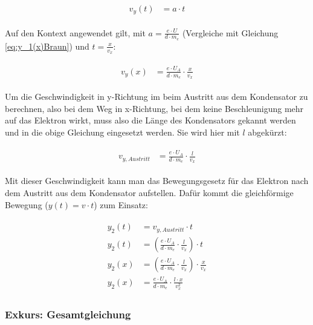 \begin{align} \label{eq:v(t)Allgemein}
\begin{split}
	v_y(t) &= a \cdot t
\end{split}
\end{align}

\noindent Auf den Kontext angewendet gilt, mit $a = \frac{e \cdot U}{d \cdot m_e}$ (Vergleiche mit Gleichung \ref{eq:y_1(x)Braun}) und $t=\frac{x}{v_x}$:

\begin{align} \label{eq:v(x)Kontext}
\begin{split}
	v_y(x) &= \frac{e \cdot U_A}{d \cdot m_e} \cdot \frac{x}{v_x}
\end{split}
\end{align}

\noindent Um die Geschwindigkeit in y-Richtung im beim Austritt aus dem Kondensator zu berechnen, also bei dem Weg in x-Richtung, bei dem keine Beschleunigung mehr auf das Elektron wirkt, muss also die Länge des Kondensators gekannt werden und in die obige Gleichung eingesetzt werden. Sie wird hier mit $l$ abgekürzt:

\begin{align} \label{eq:v(t)Gesamt}
\begin{split}
	v_{y,Austritt} &= \frac{e \cdot U_A}{d \cdot m_e} \cdot \frac{l}{v_x}
\end{split}
\end{align}

\noindent Mit dieser Geschwindigkeit kann man das Bewegungsgesetz für das Elektron nach dem Austritt aus dem Kondensator aufstellen. Dafür kommt die gleichförmige Bewegung ($y(t) = v \cdot t$) zum Einsatz:

\begin{align} \label{eq:y(t)Gesamt}
\begin{split}
	y_2(t) &= v_{y,Austritt} \cdot t \\
	y_2(t) &= (\frac{e \cdot U_A}{d \cdot m_e} \cdot \frac{l}{v_x}) \cdot t \\
	y_2(x) &= (\frac{e \cdot U_A}{d \cdot m_e} \cdot \frac{l}{v_x}) \cdot \frac{x}{v_x} \\
	y_2(x) &= \frac{e \cdot U_A}{d \cdot m_e} \cdot \frac{l \cdot x}{v_{x}^2}
\end{split}
\end{align}

\subsubsection{Exkurs: Gesamtgleichung}

